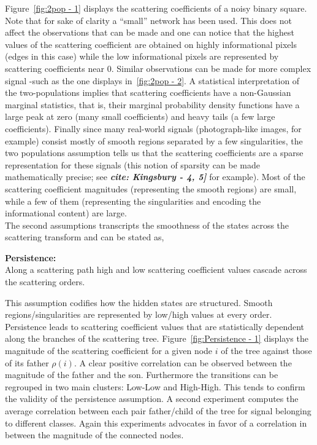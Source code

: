 \documentclass[a4paper,11pt]{report}
\begin{document}
{		Figure~\ref{fig:2pop - 1} displays the scattering coefficients of a noisy binary square. Note that for sake of clarity a ``small'' network has been used. This does not affect the observations that can be made and one can notice that the highest values of the scattering coefficient are obtained on highly informational pixels (edges in this case) while the low informational pixels are represented by scattering coefficients near $0$. Similar observations can be made for more complex signal -such as the one displays in~\ref{fig:2pop - 2}. A statistical interpretation of the two-populations implies that scattering coefficients have a non-Gaussian marginal statistics, that is, their marginal probability density functions have a large peak at zero (many small coefficients) and heavy tails (a few large coefficients). Finally since many real-world signals (photograph-like images, for example) consist mostly of smooth regions separated by a few singularities, the two populations assumption tells us that the scattering coefficients are a sparse representation for these signals (this notion of sparsity can be made mathematically precise; see \textbf{\textit{cite: Kingsbury - 4, 5]}} for example). Most of the scattering coefficient magnitudes (representing the smooth regions) are small, while a few of them (representing the singularities and encoding the informational content) are large.\\
		
		The second assumptions transcripts the smoothness of the states across the scattering transform and can be stated as,\\
		
		\begin{assumption}\textbf{Persistence:}\\
		  Along a scattering path high and low scattering coefficient values cascade across the scattering orders.\\
		  \label{assum:Persistence}
		\end{assumption}

		This assumption codifies how the hidden states are structured. Smooth regions/singularities are represented by low/high values at every order. Persistence leads to scattering coefficient values that are statistically dependent along the branches of the scattering tree. Figure~\ref{fig:Persistence - 1} displays the magnitude of the scattering coefficient for a given node $i$ of the tree against those of its father $\rho(i)$. A clear positive correlation can be observed between the magnitude of the father and the son. Furthermore the transitions can be regrouped in two main clusters: Low-Low and High-High. This tends to confirm the validity of the persistence assumption. A second experiment computes the average correlation between each pair father/child of the tree for signal belonging to different classes. Again this experiments advocates in favor of a correlation in between the magnitude of the connected nodes.  
		
}
\end{document}
